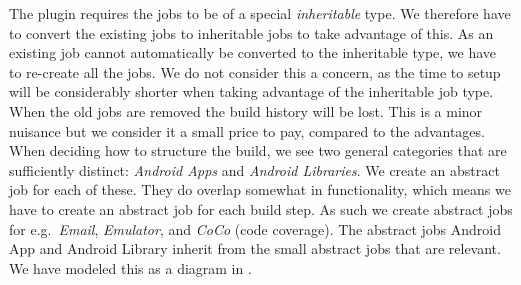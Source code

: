 The plugin requires the jobs to be of a special \emph{inheritable} type. We therefore have to convert the existing jobs to inheritable jobs to take advantage of this. As an existing job cannot automatically be converted to the inheritable type, we have to re-create all the jobs. We do not consider this a concern, as the time to setup will be considerably shorter when taking advantage of the inheritable job type. When the old jobs are removed the build history will be lost. This is a minor nuisance but we consider it a small price to pay, compared to the advantages. When deciding how to structure the build, we see two general categories that are sufficiently distinct: \emph{Android Apps} and \emph{Android Libraries}. We create an abstract job for each of these. They do overlap somewhat in functionality, which means we have to create an abstract job for each build step. As such we create abstract jobs for e.g.\ \emph{Email}, \emph{Emulator}, and \emph{CoCo} (code coverage). The abstract jobs Android App and Android Library inherit from the small abstract jobs that are relevant. We have modeled this as a diagram in .

